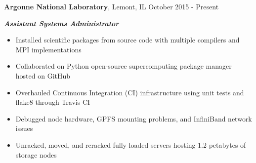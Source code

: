 
\textbf{Argonne National Laboratory}, Lemont, IL \hfill October 2015 - Present

\textbf{\textit{Assistant Systems Administrator}}

\begin{itemize}
    \item Installed scientific packages from source code with multiple compilers and MPI implementations
    \item Collaborated on Python open-source supercomputing package manager hosted on GitHub
    \item Overhauled Continuous Integration (CI) infrastructure using unit tests and flake8 through Travis CI
    \item Debugged node hardware, GPFS mounting problems, and InfiniBand network issues
    \item Unracked, moved, and reracked fully loaded servers hosting 1.2 petabytes of storage nodes
\end{itemize}
